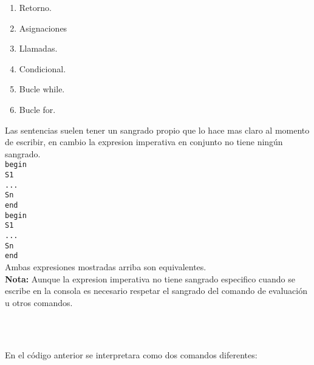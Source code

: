       \begin{enumerate}
         \item Retorno.
         \item Asignaciones
         \item Llamadas.
         \item Condicional.
         \item Bucle while.
         \item Bucle for.
      \end{enumerate}
      
      Las sentencias suelen tener un sangrado propio que lo hace mas claro al momento de escribir, en cambio la expresion imperativa en conjunto no tiene ningún sangrado.
      \\
      
      \texttt{\linetab begin}\\
      \texttt{\linetab S1}\\
      \texttt{\linetab ...}\\
      \texttt{\linetab Sn}\\
      \texttt{end}
      \\
      
      \texttt{begin}\\
      \texttt{\linetab S1}\\
      \texttt{\linetab ...}\\
      \texttt{\linetab Sn}\\
      \texttt{\linetab end}
      \\
      
      Ambas expresiones mostradas arriba son equivalentes.
      \\
      
      {\bf Nota:} Aunque la expresion imperativa no tiene sangrado especifico cuando se escribe en la consola es necesario respetar el sangrado del comando de evaluación u otros comandos.
      
      \begin{fxcode}
         \\
         \\
      \end{fxcode}
      
      En el código anterior se interpretara como dos comandos diferentes:
      
      \begin{fxcode}
         \\
      \end{fxcode}
      
